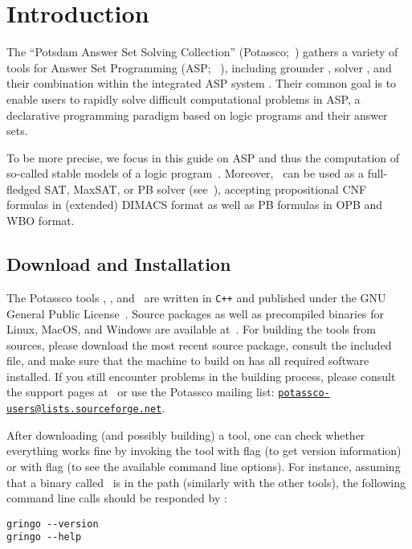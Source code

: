 \section{Introduction}\label{sec:introduction}

The ``Potsdam Answer Set Solving Collection'' (Potassco;~\cite{potassco,gekakaosscsc11a,gekakasc12a})
gathers a variety of tools for Answer Set Programming (ASP;~%
\cite{ankolisc05a,baral02a,breitr11a,gelfond08a,gelkah14a,gelleo02a,lifschitz02a,martru99a,niemela99a}),
including grounder \gringo, solver \clasp, and their combination within the integrated ASP system \clingo.
Their common goal is to enable users
to rapidly solve difficult computational problems in ASP,
a declarative programming paradigm based on
logic programs and their answer sets.

To be more precise, 
we focus in this guide on ASP and thus the computation of so-called stable models of a logic program~\cite{gellif88b}.
Moreover, \clasp\ can be used as a full-fledged SAT, MaxSAT, or PB solver (see~\cite{SATHandbook}), 
accepting propositional CNF formulas in (extended) DIMACS format as well as PB formulas in OPB and WBO format.

\subsection{Download and Installation}

The Potassco tools \gringo, \clasp, and \clingo\
are written in \texttt{C++} and published under the GNU General Public License~\cite{GNUgpl}.
Source packages as well as precompiled binaries for Linux, MacOS, and Windows
are available at~\cite{potassco}.
For building the tools from sources,
please download the most recent source package, consult the
included  %
file,
and make sure that the machine to build on has all
required software installed.
If you still encounter problems in the building process,
please 
consult the support pages at~\cite{potassco}
or use the Potassco mailing list:
\href{mailto:potassco-users@lists.sourceforge.net}{\texttt{potassco-users@lists.sourceforge.net}}.


After downloading (and possibly building) a tool,
one can check whether everything works fine by invoking the tool
with flag \code{--version} (to get version information) or
with flag  (to see the available command line options).
For instance, assuming that a binary called \gringo\ is in the path
(similarly with the other tools),
the following command line calls should be responded by \gringo:
%
\begin{lstlisting}[numbers=none]
gringo --version
gringo --help
\end{lstlisting}


